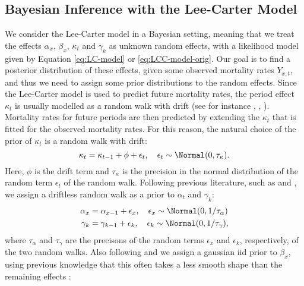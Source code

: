 \subsection{Bayesian Inference with the Lee-Carter Model}
\label{sec:BayesianInferenceLC}
We consider the Lee-Carter model in a Bayesian setting, meaning that we treat the effects $\alpha_x$, $\beta_x$, $\kappa_t$ and $\gamma_k$ as unknown random effects, with a likelihood model given by Equation \ref{eq:LC-model} or \ref{eq:LCC-model-orig}. Our goal is to find a posterior distribution of these effects, given some observed mortality rates $Y_{x,t}$, and thus we need to assign some prior distributions to the random effects. Since the Lee-Carter model is used to predict future mortality rates, the period effect $\kappa_t$ is usually modelled as a random walk with drift (see for instance \textcite{LeeCarter1992}, \textcite{Wisniowski2015}, \textcite{CZADO2005260}). Mortality rates for future periods are \textcolor{myDarkGreen}{then predicted by extending the $\kappa_t$ that is fitted for the observed mortality rates.} For this reason, the natural choice of the prior of $\kappa_t$ is a random walk with drift:
\begin{equation}
    \kappa_t = \kappa_{t-1} + \phi  + \epsilon_t,\quad \epsilon_t \sim \Normal(0,\tau_{\kappa}).
    \label{eq:randomWalkDrift}
\end{equation}
Here, $\phi$ is the drift term and $\tau_{\kappa}$ is the precision in the normal distribution of the random term $\epsilon_t$ of the random walk. 
Following previous literature, such as \textcite{CZADO2005260} and \textcite{Wisniowski2015}, we assign a driftless random walk as a prior to $\alpha_t$ and $\gamma_k$:
\begin{equation}
    \begin{aligned}
        \alpha_x &= \alpha_{x-1} + \epsilon_{x}, \quad \epsilon_x \sim \Normal(0,1/\tau_{\alpha}) \\
        \gamma_k &= \gamma_{k-1} + \epsilon_{k}, \quad \epsilon_k \sim \Normal(0,1/\tau_{\gamma}), \\
    \end{aligned}
\end{equation}
where $\tau_{\alpha}$ and $\tau_{\gamma}$ are the precisons of the random terms $\epsilon_x$ and $\epsilon_k$, respectively, of the two random walks. 
Also following \textcite{CZADO2005260} and \textcite{Wisniowski2015} we assign a gaussian iid prior to $\beta_x$, using previous knowledge that this often takes a less smooth shape than the remaining effects \parencite{CZADO2005260}:
